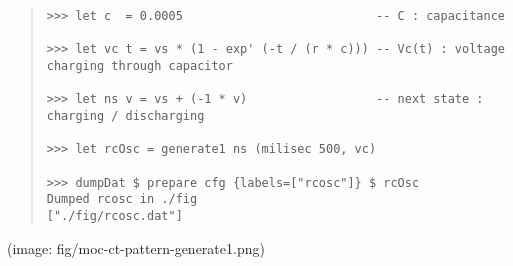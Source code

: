 \begin{haddockdesc}
\begin{quote}
{\begin{verbatim}
>>> let c  = 0.0005                           -- C : capacitance

>>> let vc t = vs * (1 - exp' (-t / (r * c))) -- Vc(t) : voltage charging through capacitor

>>> let ns v = vs + (-1 * v)                  -- next state : charging / discharging

>>> let rcOsc = generate1 ns (milisec 500, vc)

>>> dumpDat $ prepare cfg {labels=["rcosc"]} $ rcOsc
Dumped rcosc in ./fig
["./fig/rcosc.dat"]

\end{verbatim}}
           \end{quote}(image: fig/moc-ct-pattern-generate1.png)\par
                      
\end{haddockdesc}
